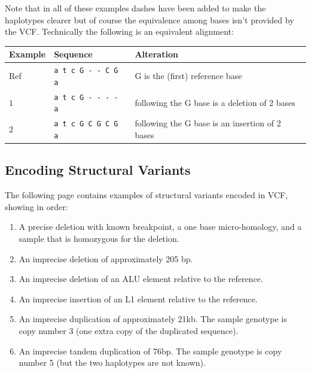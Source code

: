 \documentclass[8pt]{article}
\begin{document}
Note that in all of these examples dashes have been added to make the haplotypes clearer but of course the equivalence among bases isn't provided by the VCF.
Technically the following is an equivalent alignment:

\vspace{0.3cm}
\begin{tabular}{ | l | l | l | }
\hline
Example & Sequence & Alteration \\ \hline
Ref & \verb|a t c G - - C G a| & G is the (first) reference base \\ \hline
$1$ & \verb|a t c G - - - - a| & following the G base is a deletion of 2 bases \\ \hline
$2$ & \verb|a t c G C G C G a| & following the G base is an insertion of 2 bases \\ \hline
\end{tabular}

\subsection{Encoding Structural Variants}
The following page contains examples of structural variants encoded in VCF, showing in order:
\begin{enumerate}
  \item A precise deletion with known breakpoint, a one base micro-homology, and a sample that is homozygous for the deletion.
  \item An imprecise deletion of approximately 205 bp.
  \item An imprecise deletion of an ALU element relative to the reference.
  \item An imprecise insertion of an L1 element relative to the reference.
  \item An imprecise duplication of approximately 21kb. The sample genotype is copy number 3 (one extra copy of the duplicated sequence).
  \item An imprecise tandem duplication of 76bp. The sample genotype is copy number 5 (but the two haplotypes are not known).
\end{enumerate}
\end{document}
